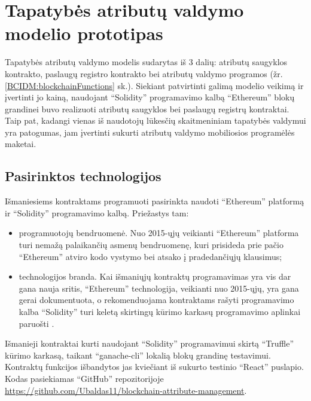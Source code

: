 \section{Tapatybės atributų valdymo modelio prototipas}

Tapatybės atributų valdymo modelis sudarytas iš 3 dalių: atributų saugyklos kontrakto, paslaugų registro kontrakto bei
atributų valdymo programos (žr. \hypertarget{BCIDM:blockchainFunctions}{\ref{BCIDM:blockchainFunctions}} sk.).
Siekiant patvirtinti galimą modelio veikimą ir įvertinti jo kainą, naudojant \enquote{Solidity} programavimo kalbą \enquote{Ethereum} blokų grandinei buvo
realizuoti atributų saugyklos bei paslaugų registrų kontraktai. Taip pat, kadangi vienas iš naudotojų
lūkesčių skaitmeniniam tapatybės valdymui yra patogumas, jam įvertinti sukurti atributų valdymo mobiliosios programėlės maketai.

\subsection{Pasirinktos technologijos}

Išmaniesiems kontraktams programuoti pasirinkta naudoti \enquote{Ethereum} platformą ir \enquote{Solidity} programavimo
kalbą. Priežastys tam:

\begin{itemize}
    \item programuotojų bendruomenė. Nuo 2015-ųjų veikianti \enquote{Ethereum} platforma turi nemažą
    palaikančių asmenų bendruomenę, kuri prisideda prie pačio \enquote{Ethereum} atviro kodo vystymo
    bei atsako į pradedančiųjų klausimus;
    \item technologijos branda. Kai išmaniųjų kontraktų programavimas yra vis dar gana nauja sritis,
    \enquote{Ethereum} technologija, veikianti nuo 2015-ųjų, yra gana gerai dokumentuota, o rekomenduojama kontraktams rašyti programavimo kalba
    \enquote{Solidity} \cite{Ethereum} turi keletą skirtingų kūrimo karkasų programavimo aplinkai paruošti \cite{SolidityDocumentation}.
\end{itemize}

Išmanieji kontraktai kurti naudojant \enquote{Solidity} programavimui skirtą \enquote{Truffle} kūrimo karkasą,
taikant \enquote{ganache-cli} lokalią blokų grandinę testavimui. Kontraktų funkcijos išbandytos jas kviečiant iš sukurto testinio
\enquote{React} puslapio. Kodas pasiekiamas \enquote{GitHub} repozitorijoje
\url{https://github.com/Ubaldas11/blockchain-attribute-management}.

